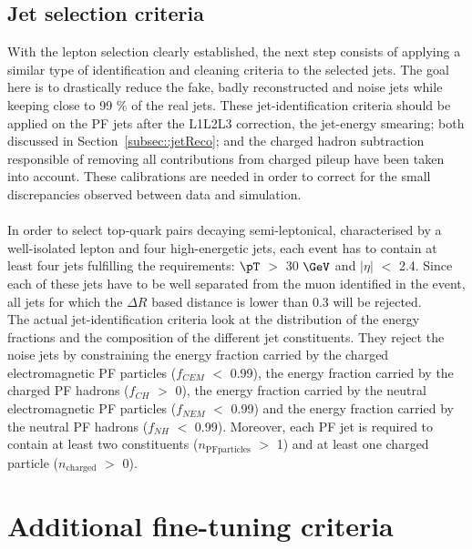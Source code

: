 \subsection{Jet selection criteria}   %
With the lepton selection clearly established, the next step consists of applying a similar type of identification and cleaning criteria to the selected jets.
The goal here is to drastically reduce the fake, badly reconstructed and noise jets while keeping close to 99 $\%$ of the real jets. 
These jet-identification criteria should be applied on the PF jets after the L1L2L3 correction, the jet-energy smearing; both discussed in Section~\ref{subsec::jetReco}; and the charged hadron subtraction responsible of removing all contributions from charged pileup have been taken into account. These calibrations are needed in order to correct for the small discrepancies observed between data and simulation.
\\
\\
In order to select top-quark pairs decaying semi-leptonical, characterised by a well-isolated lepton and four high-energetic jets, each event has to contain at least four jets fulfilling the requirements: $\pT$ $>$ 30 $\GeV$ and $\vert \eta \vert$ $<$ 2.4.
Since each of these jets have to be well separated from the muon identified in the event, all jets for which the $\Delta R$ based distance is lower than 0.3 will be rejected.
\\
The actual jet-identification criteria look at the distribution of the energy fractions and the composition of the different jet constituents.
They reject the noise jets by constraining the energy fraction carried by the charged electromagnetic PF particles ($f_{CEM}$ $<$ 0.99), the energy fraction carried by the charged PF hadrons ($f_{CH}$ $>$ 0), the energy fraction carried by the neutral electromagnetic PF particles ($f_{NEM}$ $<$ 0.99) and the energy fraction carried by the neutral PF hadrons ($f_{NH}$ $<$ 0.99).
Moreover, each PF jet is required to contain at least two constituents ($n_{\textrm{PFparticles}}$ $>$ 1) and at least one charged particle ($n_{\textrm{charged}}$ $>$ 0).

\section{Additional fine-tuning criteria}\label{sec::SpecificSelec}


